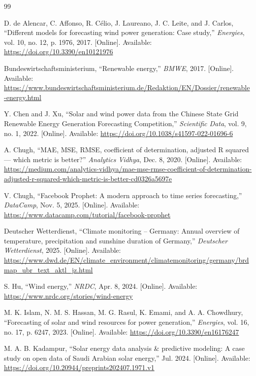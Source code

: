 \documentclass[conference]{IEEEtran}
\begin{document}
\begin{thebibliography}{99}

D. de Alencar, C. Affonso, R. C\'elio, J. Laureano, J. C. Leite, and J. Carlos, ``Different models for forecasting wind power generation: Case study,'' \emph{Energies}, vol. 10, no. 12, p. 1976, 2017. [Online]. Available: \url{https://doi.org/10.3390/en10121976}

Bundeswirtschaftsministerium, ``Renewable energy,'' \emph{BMWE}, 2017. [Online]. Available: \url{https://www.bundeswirtschaftsministerium.de/Redaktion/EN/Dossier/renewable-energy.html}

Y. Chen and J. Xu, ``Solar and wind power data from the Chinese State Grid Renewable Energy Generation Forecasting Competition,'' \emph{Scientific Data}, vol. 9, no. 1, 2022. [Online]. Available: \url{https://doi.org/10.1038/s41597-022-01696-6}

A. Chugh, ``MAE, MSE, RMSE, coefficient of determination, adjusted R squared --- which metric is better?'' \emph{Analytics Vidhya}, Dec. 8, 2020. [Online]. Available: \url{https://medium.com/analytics-vidhya/mae-mse-rmse-coefficient-of-determination-adjusted-r-squared-which-metric-is-better-cd0326a5697e}

V. Chugh, ``Facebook Prophet: A modern approach to time series forecasting,'' \emph{DataCamp}, Nov. 5, 2025. [Online]. Available: \url{https://www.datacamp.com/tutorial/facebook-prophet}

Deutscher Wetterdienst, ``Climate monitoring -- Germany: Annual overview of temperature, precipitation and sunshine duration of Germany,'' \emph{Deutscher Wetterdienst}, 2025. [Online]. Available: \url{https://www.dwd.de/EN/climate_environment/climatemonitoring/germany/brdmap_ubr_text_aktl_jz.html}

S. Hu, ``Wind energy,'' \emph{NRDC}, Apr. 8, 2024. [Online]. Available: \url{https://www.nrdc.org/stories/wind-energy}

M. K. Islam, N. M. S. Hassan, M. G. Rasul, K. Emami, and A. A. Chowdhury, ``Forecasting of solar and wind resources for power generation,'' \emph{Energies}, vol. 16, no. 17, p. 6247, 2023. [Online]. Available: \url{https://doi.org/10.3390/en16176247}

M. A. B. Kadampur, ``Solar energy data analysis \& predictive modeling: A case study on open data of Saudi Arabian solar energy,'' Jul. 2024. [Online]. Available: \url{https://doi.org/10.20944/preprints202407.1971.v1}


\end{thebibliography}
\end{document}
